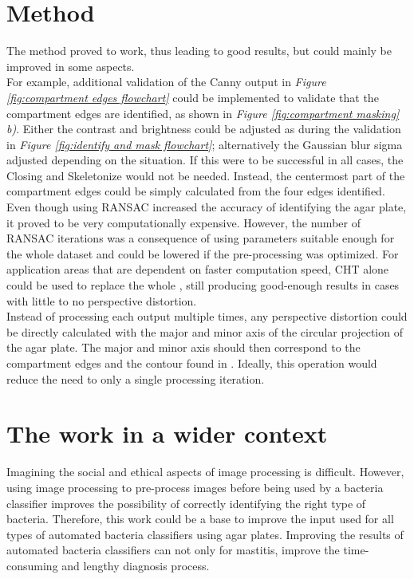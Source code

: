 \section{Method}
\label{sec:discussion-method}

The method proved to work, thus leading to good results, but could mainly be improved in some aspects. \\

\noindent For example, additional validation of the Canny output in \textit{Figure \ref{fig:compartment edges flowchart}} could be implemented to validate that the compartment edges are identified, as shown in \textit{Figure \ref{fig:compartment masking} b)}. Either the contrast and brightness could be adjusted as during the validation in \textit{Figure \ref{fig:identify and mask flowchart}}; alternatively the Gaussian blur sigma adjusted depending on the situation. If this were to be successful in all cases, the Closing and Skeletonize would not be needed. Instead, the centermost part of the compartment edges could be simply calculated from the four edges identified. \\

\noindent Even though using RANSAC increased the accuracy of identifying the agar plate, it proved to be very computationally expensive. However, the number of RANSAC iterations was a consequence of using parameters suitable enough for the whole dataset and could be lowered if the pre-processing was optimized. For application areas that are dependent on faster computation speed, CHT alone could be used to replace the whole , still producing good-enough results in cases with little to no perspective distortion.\\

\noindent Instead of processing each output multiple times, any perspective distortion could be directly calculated with the major and minor axis of the circular projection of the agar plate. The major and minor axis should then correspond to the compartment edges and the contour found in . Ideally, this operation would reduce the need to only a single processing iteration.




\item 
\section{The work in a wider context}
\label{sec:work-wider-context}
Imagining the social and ethical aspects of image processing is difficult. However, using image processing to pre-process images before being used by a bacteria classifier improves the possibility of correctly identifying the right type of bacteria. Therefore, this work could be a base to improve the input used for all types of automated bacteria classifiers using agar plates. Improving the results of automated bacteria classifiers can not only for mastitis, improve the time-consuming and lengthy diagnosis process. \\
 
